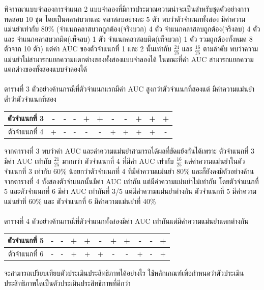 \documentclass[twoside, twocolumn, 12pt]{article}
\begin{document}
พิจารณาแบบจำลองการจำแนก 2 แบบจำลองที่มีการประมาณความน่าจะเป็นสำหรับชุดตัวอย่างการทดสอบ 10 ชุด โดยเป็นคลาสบวกและ คลาสลบอย่างละ 5 ตัว พบว่าตัวจำแนกทั้งสอง มีค่าความแม่นยำเท่ากับ 80\% (จำแนกคลาสบวกถูกต้อง(จริงบวก) 4 ตัว จำแนกคลาสลบถูกต้อง(จริงลบ) 4 ตัวและ จำแนกคลาสบวกผิด(เท็จลบ) 1 ตัว จำแนกคลาสลบผิด(เท็จบวก) 1 ตัว รวมถูกต้องทั้งหมด 8 ตัวจาก 10 ตัว) แต่ค่า AUC ของตัวจำแนกที่ 1 และ 2 นั้นเท่ากับ $\frac{24}{25}$ และ $\frac{16}{25}$ ตามลำดับ 
พบว่าความแม่นยำไม่สามารถแยกความแตกต่างของทั้งสองแบบจำลองได้ ในขณะที่ค่า AUC สามารถแยกความแตกต่างของทั้งสองแบบจำลองได้\\\\
ตารางที่ 3 ตัวอย่างค้านกรณีที่ตัวจำแนกแรกมีค่า AUC สูงกว่าตัวจำแนกที่สองแต่ มีค่าความแม่นยำต่ำว่าตัวจำแนกที่สอง
\begin{center}
\begin{tabular}{|c|ccccc|ccccc|}
  \hline
  ตัวจำแนกที่ 3 &-& -& -& +& +& -& -& +& +& +\\
  \hline
  ตัวจำแนกที่ 4 & +& -& -& -& -& +& +& +& +& -\\
  \hline  
\end{tabular}
\end{center}

จากตารางที่ 3 พบว่าค่า AUC และค่าความแม่นยำสามารถได้ผลที่ขัดแย้งกันได้เพราะ ตัวจำแนกที่ 3 มีค่า AUC เท่ากับ $\frac{21}{25}$ มากกว่า ตัวจำแนกที่ 4 ที่มีค่า AUC เท่ากับ $\frac{16}{25}$ แต่ค่าความแม่นยำในตัวจำแนกที่ 3 เท่ากับ 60\% น้อยกว่าตัวจำแนกที่ 4 ที่มีค่าความแม่นยำ 80\% และก็ยังคงมีตัวอย่างค้านจากตารางที่ 4 ทั้งสองตัวจำแนกนั้นมีค่า AUC เท่ากัน แต่มีค่าความแม่นยำไม่เท่ากัน โดยตัวจำแนกที่ 5 และตัวจำแนกที่ 6 มีค่า AUC เท่ากันที่ 3/5 แต่มีค่าความแม่นยำต่างกัน ตัวจำแนกที่ 5 มีค่าความแม่นยำที่ 60\% และ ตัวจำแนกที่ 6 มีค่าความแม่นยำที่ 40\% 
\\\\
ตารางที่ 4 ตัวอย่างค้านกรณีที่ตัวจำแนกทั้งสองมีค่า AUC เท่ากันแต่มีค่าความแม่นยำแตกต่างกัน\begin{center}
\begin{tabular}{|c|ccccc|ccccc|}
  \hline
  ตัวจำแนกที่ 5 & -& -& +& +& -& +& +& -& -& +\\
  \hline
  ตัวจำแนกที่ 6 & -& -& +& +& +& -& -& +& -& +\\
  \hline  
\end{tabular}
\end{center}

จะสามารถเปรียบเทียบตัวประเมินประสิทธิภาพได้อย่างไร ใช้หลักเกณฑ์เพื่อกำหนดว่าตัวประเมินประสิทธิภาพใดเป็นตัวประเมินประสิทธิภาพที่ดีกว่า
\end{document}
